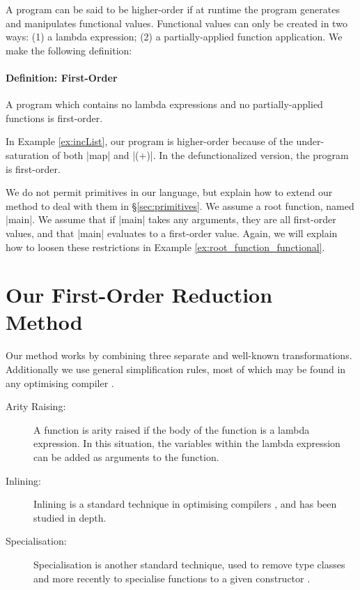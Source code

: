 \documentclass[preprint]{sigplanconf}
\begin{document}
A program can be said to be higher-order if at runtime the program generates and manipulates functional values. Functional values can only be created in two ways: (1) a lambda expression; (2) a partially-applied function application. We make the following definition:

\paragraph{Definition: First-Order} A program which contains no lambda expressions and no partially-applied functions is first-order.

In Example \ref{ex:incList}, our program is higher-order because of the under-saturation of both |map| and |(+)|. In the defunctionalized version, the program is first-order.

We do not permit primitives in our language, but explain how to extend our method to deal with them in \S\ref{sec:primitives}. We assume a root function, named |main|. We assume that if |main| takes any arguments, they are all first-order values, and that |main| evaluates to a first-order value. Again, we will explain how to loosen these restrictions in Example \ref{ex:root_function_functional}.


\section{Our First-Order Reduction Method}
\label{sec:overview}

Our method works by combining three separate and well-known transformations. Additionally we use general simplification rules, most of which may be found in any optimising compiler \cite{spj:transformation}.

\begin{description}
\item[Arity Raising:] A function is arity raised if the body of the function is a lambda expression. In this situation, the variables within the lambda expression can be added as arguments to the function.
\item[Inlining:] Inlining is a standard technique in optimising compilers \cite{spj:inlining}, and has been studied in depth.
\item[Specialisation:] Specialisation is another standard technique, used to remove type classes \cite{jones:dictionary_free} and more recently to specialise functions to a given constructor \cite{spj:specconstr}.
\end{description}
\end{document}
